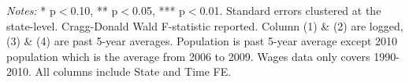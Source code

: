 \begin{table}[htbp] \centering
\caption{Effects on Business Dynamics}
\label{tab:main}
\newsavebox{\boxmain} \newlength{\tablemain}
\settowidth{\tablemain}{\usebox{\boxmain}}
\usebox{\boxmain} \vspace{0.5em} 
\parbox{\tablemain}{\footnotesize \textit{Notes:} * p$<$0.10, ** p$<$0.05, *** p$<$0.01. Standard errors clustered at the state-level. Cragg-Donald Wald F-statistic reported. Column (1) \& (2) are logged, (3) \& (4) are past 5-year averages. Population is past 5-year average except 2010 population which is the average from 2006 to 2009. Wages data only covers 1990-2010. All columns include State and Time FE.}
 \end{table}
